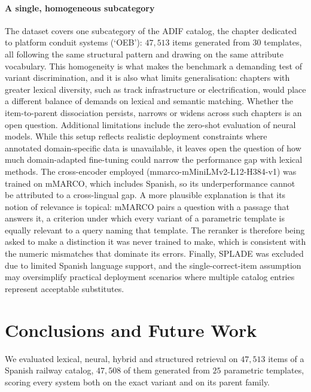 \documentclass[preprint,12pt]{elsarticle}
\begin{document}
\paragraph{A single, homogeneous subcategory} The dataset covers one subcategory of the ADIF catalog, the chapter dedicated to platform conduit systems (`OEB'): $47{,}513$ items generated from $30$ templates, all following the same structural pattern and drawing on the same attribute vocabulary. This homogeneity is what makes the benchmark a demanding test of variant discrimination, and it is also what limits generalisation: chapters with greater lexical diversity, such as track infrastructure or electrification, would place a different balance of demands on lexical and semantic matching. Whether the item-to-parent dissociation persists, narrows or widens across such chapters is an open question.
Additional limitations include the zero-shot evaluation of neural models. While this setup reflects realistic deployment constraints where annotated domain-specific data is unavailable, it leaves open the question of how much domain-adapted fine-tuning could narrow the performance gap with lexical methods. The cross-encoder employed (mmarco-mMiniLMv2-L12-H384-v1) was trained on mMARCO, which includes Spanish, so its underperformance cannot be attributed to a cross-lingual gap. A more plausible explanation is that its notion of relevance is topical: mMARCO pairs a question with a passage that answers it, a criterion under which every variant of a parametric template is equally relevant to a query naming that template. The reranker is therefore being asked to make a distinction it was never trained to make, which is consistent with the numeric mismatches that dominate its errors. Finally, SPLADE was excluded due to limited Spanish language support, and the single-correct-item assumption may oversimplify practical deployment scenarios where multiple catalog entries represent acceptable substitutes.



\section{Conclusions and Future Work}

We evaluated lexical, neural, hybrid and structured retrieval on $47{,}513$ items of a Spanish railway catalog, $47{,}508$ of them generated from $25$ parametric templates, scoring every system both on the exact variant and on its parent family.
\end{document}

